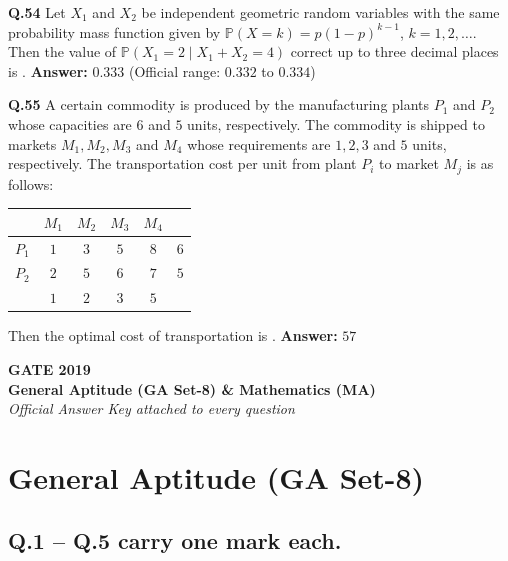 \documentclass[11pt,a4paper]{article}
\newcommand{\ans}[1]{\textbf{Answer:} #1\par\medskip}
\begin{document}
\textbf{Q.54} Let $X_1$ and $X_2$ be independent geometric random variables with the same probability mass function given by $\mathbb{P}(X = k) = p(1 - p)^{k-1}$, $k = 1, 2, \dots$. Then the value of $\mathbb{P}(X_1 = 2 \mid X_1 + X_2 = 4)$ correct up to three decimal places is \underline{\hspace{2cm}}.
\ans{$0.333$ (Official range: $0.332$ to $0.334$)}

\textbf{Q.55} A certain commodity is produced by the manufacturing plants $P_1$ and $P_2$ whose capacities are $6$ and $5$ units, respectively. The commodity is shipped to markets $M_1, M_2, M_3$ and $M_4$ whose requirements are $1, 2, 3$ and $5$ units, respectively. The transportation cost per unit from plant $P_i$ to market $M_j$ is as follows:
\begin{center}
\begin{tabular}{c|cccc|c}
 & $M_1$ & $M_2$ & $M_3$ & $M_4$ & \\
\hline
$P_1$ & $1$ & $3$ & $5$ & $8$ & $6$ \\
$P_2$ & $2$ & $5$ & $6$ & $7$ & $5$ \\
\hline
 & $1$ & $2$ & $3$ & $5$ &
\end{tabular}
\end{center}
Then the optimal cost of transportation is \underline{\hspace{2cm}}.
\ans{$57$}

\newpage


\begin{center}
  {\LARGE\bfseries GATE 2019}\\[4pt]
  {\large\bfseries General Aptitude (GA Set-8) \& Mathematics (MA)}\\[2pt]
  {\small\itshape Official Answer Key attached to every question}
\end{center}
\medskip

\section*{General Aptitude (GA Set-8)}

\subsection*{Q.1 -- Q.5 carry one mark each.}
\end{document}

